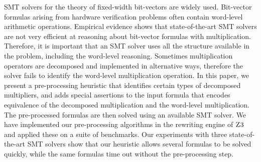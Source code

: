 %
SMT solvers for the theory of fixed-width bit-vectors are widely used.
%
Bit-vector formulas arising from hardware verification problems often contain word-level arithmetic operations.
%
Empirical evidence
shows that state-of-the-art SMT solvers are not very efficient at reasoning about bit-vector formulas with multiplication.
%
Therefore, it is important that an SMT solver uses all 
the structure available in the problem, including the
word-level reasoning.
%
Sometimes multiplication operators are decomposed and implemented in
alternative ways, therefore the solver fails to identify the word-level
multiplication operation.
%
In this paper, we present a pre-processing heuristic that identifies certain types of decomposed multipliers, and adds special assertions to the input
formula that encodes equivalence of the decomposed multiplication and
the word-level multiplication.  The pre-processed formulas are then
solved using an available SMT solver.
%
We have implemented our pre-processing algorithms in the rewriting
engine of $\textsc{Z3}$ and applied these on a suite of benchmarks.
%
Our experiments with three state-of-the-art SMT solvers show that our
heuristic allows several formulas to be solved quickly, while the same
formulas time out without the pre-processing step.
%


